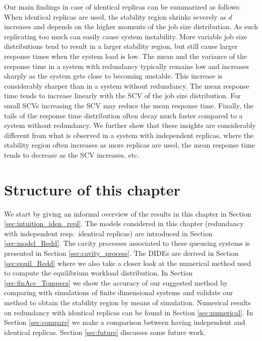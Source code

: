 \documentclass[12pt]{report}
\begin{document}
Our main findings in case of identical replicas can be summarized as follows: When identical replicas are used, the stability region shrinks severely as $d$ increases and depends on the higher moments of the job size distribution. As such replicating too
much can easily cause system instability. 
More variable job size distributions tend to result in a larger stability region, but still cause
larger response times when the system load is low. 
The mean and the variance of the response time in a system with redundancy typically remains low and increases sharply as the system gets close to becoming unstable. This increase is considerably sharper than in a system without redundancy. 
The mean response time tends to increase linearly with the SCV
of the job size distribution. For small SCVs increasing the SCV may reduce the mean response time.
Finally, the tails of the response time distribution often decay much faster compared to a system without
redundancy.
We further show that these insights are considerably different from what is observed in a system with independent replicas,
where the stability region often increases as more replicas are used, the mean response time tends to decrease as the SCV increases, etc.

\section{Structure of this chapter}
We start by giving an informal overview of the results in this chapter in Section \ref{sec:intuition_iden_repl}. The models considered in this chapter (redundancy with independent resp.~identical replicas) are introduced in Section \ref{sec:model_Redd}. The cavity processes associated to these queueing systems is presented in Section \ref{sec:cavity_process}. The DIDEs are derived in Section \ref{sec:equil_Redd} where we also take a closer look at the numerical method used to compute the equilibrium workload distribution. In Section \ref{sec:finAcc_Tompecs} we show the accuracy of our suggested method by comparing with simulations of finite dimensional systems and validate our method to obtain the stability region by means of simulation. Numerical results on redundancy with identical replicas can be found in Section \ref{sec:numerical}. In Section \ref{sec:compare} we make a comparison between having independent and identical replicas. Section \ref{sec:future} discusses some future work.
\end{document}
